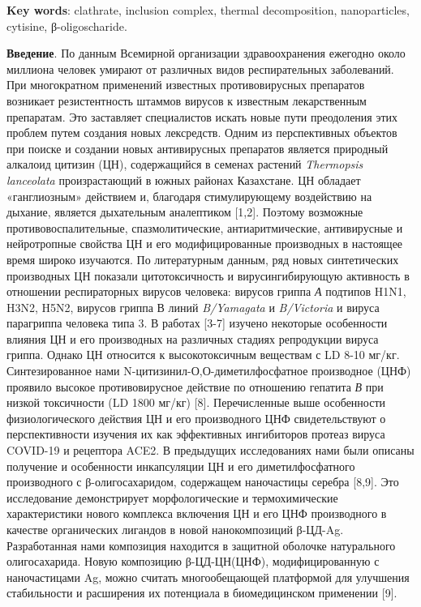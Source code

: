 {\bfseries Key words}: clathrate, inclusion complex, thermal decomposition,
nanoparticles, cytisine, β-oligoschar\-ide.

\begin{multicols}{2}
{\bfseries Введение}. По данным Всемирной организации здравоохранения
ежегодно около миллиона человек умирают от различных видов
респирательных заболеваний. При многократном применений известных
противовирусных препаратов возникает резистентность штаммов вирусов к
известным лекарственным препаратам. Это заставляет специалистов искать
новые пути преодоления этих проблем путем создания новых лексредств.
Одним из перспективных объектов при поиске и создании новых антивирусных
препаратов является природный алкалоид цитизин (ЦН), содержащийся в
семенах растений \emph{Thermopsis lanceolata} произрастающий в южных
районах Казахстане. ЦН обладает «ганглиозным» действием и, благодаря
стимулирующему воздействию на дыхание, является дыхательным аналептиком
{[}1,2{]}. Поэтому возможные противовоспалительные, спазмолитические,
антиаритмические, антивирусные и нейротропные свойства ЦН и его
модифицированные производных в настоящее время широко изучаются. По
литературным данным, ряд новых синтетических производных ЦН показали
цитотоксичность и вирусингибирующую активность в отношении респираторных
вирусов человека: вирусов гриппа \emph{А} подтипов H1N1, H3N2, H5N2,
вирусов гриппа В линий \emph{B/Yamagata} и \emph{B/Victoria} и вируса
парагриппа человека типа 3. В работах {[}3-7{]} изучено некоторые
особенности влияния ЦН и его производных на различных стадиях
репродукции вируса гриппа. Однако ЦН относится к высокотоксичным
веществам с LD 8-10 мг/кг. Синтезированное нами
N-цитизинил-О,О-диметилфосфатное производное (ЦНФ) проявило высокое
противовирусное действие по отношению гепатита \emph{В} при низкой
токсичности (LD 1800 мг/кг) {[}8{]}. Перечисленные
выше особенности физиологического действия ЦН и его производного ЦНФ
свидетельствуют о перспективности изучения их как эффективных
ингибиторов протеаз вируса COVID-19 и рецептора ACE2. В предыдущих
исследованиях нами были описаны получение и особенности инкапсуляции ЦН
и его диметилфосфатного производного с β-олигосахаридом, содержащем
наночастицы серебра {[}8,9{]}. Это исследование демонстрирует
морфологические и термохимические характеристики нового комплекса
включения ЦН и его ЦНФ производного в качестве органических лигандов в
новой нанокомпозиций β-ЦД-Ag. Разработанная нами композиция находится в
защитной оболочке натурального олигосахарида. Новую композицию
β-ЦД-ЦН(ЦНФ), модифицированную с наночастицами Ag, можно считать
многообещающей платформой для улучшения стабильности и расширения их
потенциала в биомедицинском применении {[}9{]}.


\end{multicols}
